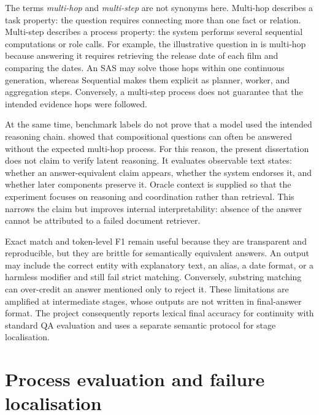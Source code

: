 The terms \emph{multi-hop} and \emph{multi-step} are not synonyms here. Multi-hop describes a task property: the question requires connecting more than one fact or relation. Multi-step describes a process property: the system performs several sequential computations or role calls. For example, the illustrative question in  is multi-hop because answering it requires retrieving the release date of each film and comparing the dates. An SAS may solve those hops within one continuous generation, whereas Sequential makes them explicit as planner, worker, and aggregation steps. Conversely, a multi-step process does not guarantee that the intended evidence hops were followed.

At the same time, benchmark labels do not prove that a model used the intended reasoning chain. \citet{min2019compositional} showed that compositional questions can often be answered without the expected multi-hop process. For this reason, the present dissertation does not claim to verify latent reasoning. It evaluates observable text states: whether an answer-equivalent claim appears, whether the system endorses it, and whether later components preserve it. Oracle context is supplied so that the experiment focuses on reasoning and coordination rather than retrieval. This narrows the claim but improves internal interpretability: absence of the answer cannot be attributed to a failed document retriever.

Exact match and token-level F1 remain useful because they are transparent and reproducible, but they are brittle for semantically equivalent answers. An output may include the correct entity with explanatory text, an alias, a date format, or a harmless modifier and still fail strict matching. Conversely, substring matching can over-credit an answer mentioned only to reject it. These limitations are amplified at intermediate stages, whose outputs are not written in final-answer format. The project consequently reports lexical final accuracy for continuity with standard QA evaluation and uses a separate semantic protocol for stage localisation.

\section{Process evaluation and failure localisation}

